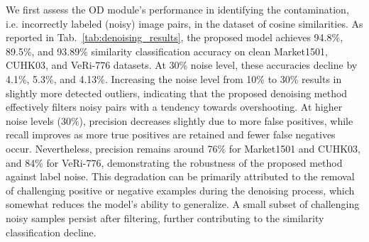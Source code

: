 \documentclass[lettersize,journal]{IEEEtran}
\begin{document}
\begin{table}[!t]
\caption{
Noise Identification performance of the OD based on Gaussian, Gamma and Beta mixtures with various random noise levels on CUHK03 Dataset (5 runs Average)}
\label{tab:BGG_outlier}
\end{table}

\vskip 0.15cm
We first assess the OD module's performance 
in identifying the contamination, i.e. incorrectly labeled (noisy) image pairs, in the dataset of cosine similarities. As reported in Tab.~\ref{tab:denoising_results},
the proposed model achieves 94.8\%, 89.5\%, and 93.89\% similarity classification accuracy on clean Market1501, CUHK03, and VeRi-776 datasets. At 30\% noise level, these accuracies decline by 4.1\%, 5.3\%, and 4.13\%. 
Increasing the noise level from 10\% to 30\% results in slightly more detected outliers, indicating that the proposed denoising method effectively filters noisy pairs with a tendency towards overshooting. At higher noise levels (30\%), precision decreases slightly due to more false positives, while recall improves as more true positives are retained and fewer false negatives occur. Nevertheless, precision remains around 76\% for Market1501 and CUHK03, and 84\% for VeRi-776, demonstrating the robustness of the proposed method against label noise. This degradation can be primarily attributed to the removal of challenging positive or negative examples during the denoising process, which somewhat reduces the model’s ability to generalize. A small subset of challenging noisy samples persist after filtering, further contributing to the similarity classification decline. 
\end{document}
